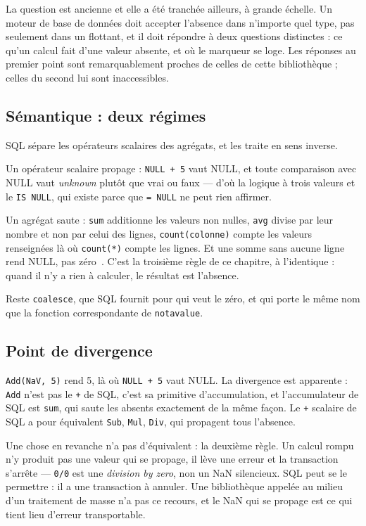 \documentclass[11pt,a4paper]{report}
\begin{document}
La question est ancienne et elle a été tranchée ailleurs, à grande
échelle. Un moteur de base de données doit accepter l'absence dans
n'importe quel type, pas seulement dans un flottant, et il doit répondre
à deux questions distinctes : ce qu'un calcul fait d'une valeur absente,
et où le marqueur se loge. Les réponses au premier point sont
remarquablement proches de celles de cette bibliothèque ; celles du
second lui sont inaccessibles.

\subsection{Sémantique : deux régimes}

SQL sépare les opérateurs scalaires des agrégats, et les traite en sens
inverse.

Un opérateur scalaire propage : \texttt{NULL\ +\ 5} vaut NULL, et toute
comparaison avec NULL vaut \emph{unknown} plutôt que vrai ou faux ---
d'où la logique à trois valeurs et le \texttt{IS\ NULL}, qui existe
parce que \texttt{=\ NULL} ne peut rien affirmer.

Un agrégat saute : \texttt{sum} additionne les valeurs non nulles,
\texttt{avg} divise par leur nombre et non par celui des lignes,
\texttt{count(colonne)} compte les valeurs renseignées là où
\texttt{count(*)} compte les lignes. Et une somme sans aucune ligne
rend NULL, pas zéro~\cite{pgaggregates}. C'est la troisième règle de ce
chapitre, à l'identique : quand il n'y a rien à calculer, le résultat
est l'absence.

Reste \texttt{coalesce}, que SQL fournit pour qui veut le zéro, et qui
porte le même nom que la fonction correspondante de
\texttt{notavalue}.

\subsection{Point de divergence}

\texttt{Add(NaV,\ 5)} rend 5, là où \texttt{NULL\ +\ 5} vaut NULL. La
divergence est apparente : \texttt{Add} n'est pas le \texttt{+} de SQL,
c'est sa primitive d'accumulation, et l'accumulateur de SQL est
\texttt{sum}, qui saute les absents exactement de la même façon. Le
\texttt{+} scalaire de SQL a pour équivalent \texttt{Sub},
\texttt{Mul}, \texttt{Div}, qui propagent tous l'absence.

Une chose en revanche n'a pas d'équivalent : la deuxième règle. Un
calcul rompu n'y produit pas une valeur qui se propage, il lève une
erreur et la transaction s'arrête --- \texttt{0/0} est une
\emph{division by zero}, non un NaN silencieux. SQL peut se le
permettre : il a une transaction à annuler. Une bibliothèque appelée au
milieu d'un traitement de masse n'a pas ce recours, et le NaN qui se
propage est ce qui tient lieu d'erreur transportable.
\end{document}
